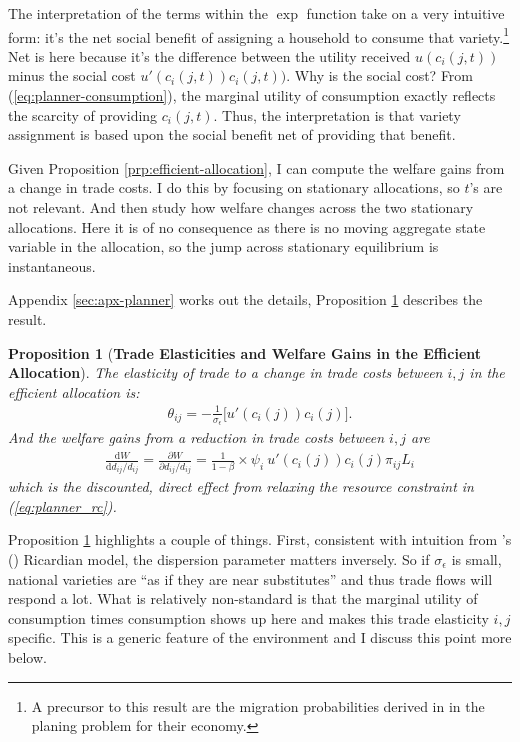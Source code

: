 \documentclass[12pt,pdftex]{article}
\newtheorem{prp}{Proposition}
\def\citeapos#1{\citeauthor{#1}'s (\citeyear{#1})}
\begin{document}
\begin{onehalfspacing}
The interpretation of the terms within the $\exp$ function take on a very intuitive form: it's the net social benefit of assigning a household to consume that variety.\footnote{A precursor to this result are the migration probabilities derived in \citet*{lagakos2023welfare} in the planing problem for their economy.} Net is here because it's the difference between the utility received $u(c_{i}(j,t))$ minus the social cost $u'(c_{i}(j,t))c_{i}(j,t))$. Why is the social cost? From (\ref{eq:planner-consumption}), the marginal utility of consumption exactly reflects the scarcity of providing $c_{i}(j,t)$. Thus, the interpretation is that variety assignment is based upon the social benefit net of providing that benefit.

Given Proposition \ref{prp:efficient-allocation}, I can compute the welfare gains from a change in trade costs. I do this by focusing on stationary allocations, so $t$'s are not relevant. And then study how welfare changes across the two stationary allocations. Here it is of no consequence as there is no moving aggregate state variable in the allocation, so the jump across stationary equilibrium is instantaneous.

Appendix \ref{sec:apx-planner} works out the details, Proposition \ref{prp:gains-efficient-allocation} describes the result.

\begin{prp}[\textbf{Trade Elasticities and Welfare Gains in the Efficient Allocation}]\label{prp:gains-efficient-allocation} The elasticity of trade to a change in trade costs between $i,j$ in the efficient allocation is:
\begin{align}
\theta_{ij} =  -\frac{1}{\sigma_{\epsilon}} \bigg [ u'(c_{i}(j)) c_{i}(j) \bigg]. \label{eq:eff-trade-elasticity}
\end{align}
And the welfare gains from a reduction in trade costs between $i,j$ are
\begin{align}
\frac{\mathrm{d} W}{\mathrm{d} d_{ij} / d_{ij}} = \frac{\partial W}{\partial d_{ij} / d_{ij}} = \frac{1}{1-\beta} \times \psi_{i} \ u'(c_{i}(j)) c_{i}(j) \pi_{ij} L_i
\label{eq:eff-trade-gains}
\end{align}
which is the discounted, direct effect from relaxing the resource constraint in (\ref{eq:planner_rc}).
\end{prp}
Proposition \ref{prp:gains-efficient-allocation} highlights a couple of things. First, consistent with intuition from \citeapos{eaton2002technology} Ricardian model, the dispersion parameter matters inversely. So if $\sigma_{\epsilon}$ is small, national varieties are ``as if they are near substitutes'' and thus trade flows will respond a lot. What is relatively non-standard is that the marginal utility of consumption times consumption shows up here and makes this trade elasticity $i,j$ specific. This is a generic feature of the environment and I discuss this point more below.


\end{onehalfspacing}
\end{document}
